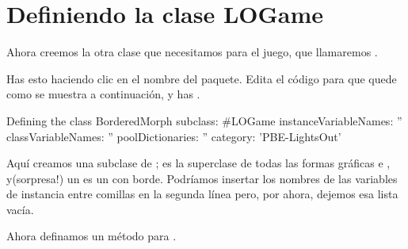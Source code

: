\documentclass[a4paper,10pt,twoside]{book}
\begin{document}

\section{Definiendo la clase LOGame}

Ahora creemos la otra clase que necesitamos para el juego, que llamaremos .


Has esto haciendo clic en el nombre del paquete.
Edita el c\'odigo para que quede como se muestra a continuaci\'on, y has .

\begin{classdef}[sbegame]{Defining the  class}
BorderedMorph subclass: #LOGame
   instanceVariableNames: ''
   classVariableNames: ''
   poolDictionaries: ''
   category: 'PBE-LightsOut'
\end{classdef}


Aqu\'i creamos una subclase de ;  es la superclase de todas las formas gr\'aficas e \pharo, y(sorpresa!) un  es un  con borde.
Podr\'iamos insertar los nombres de las variables de instancia entre comillas en la segunda l\'inea pero, por ahora, dejemos esa lista vac\'ia.

Ahora definamos un m\'etodo  para .
\end{document}
